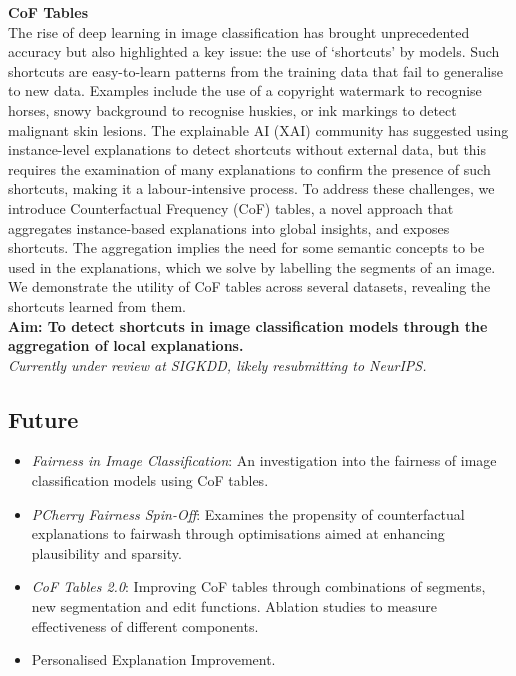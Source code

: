 \noindent
\textbf{CoF Tables}\\
The rise of deep learning in image classification has brought unprecedented accuracy but also highlighted a key 
issue: the use of `shortcuts' by models. Such shortcuts are easy-to-learn patterns from the training data that 
fail to generalise to new data. Examples include the use of a copyright watermark to recognise horses, snowy 
background to recognise huskies, or ink markings to detect malignant skin lesions. The explainable AI (XAI) 
community has suggested using instance-level explanations to detect shortcuts without external data, 
but this requires the examination of many explanations to confirm the presence of such shortcuts, making it a 
labour-intensive process. To address these challenges, we introduce Counterfactual Frequency (CoF) tables, 
a novel approach that aggregates instance-based explanations into global insights, and exposes shortcuts. 
The aggregation implies the need for some semantic concepts to be used in the explanations, which we solve by 
labelling the segments of an image. We demonstrate the utility of CoF tables across several datasets, revealing 
the shortcuts learned from them.\\
\textbf{Aim: To detect shortcuts in image classification models through the aggregation of local explanations.}\\
\textit{Currently under review at SIGKDD, likely resubmitting to NeurIPS.}

\subsection{Future}

\begin{itemize}
    \item \textit{Fairness in Image Classification}: An investigation into the fairness of image classification 
    models using CoF tables.
    \item \textit{PCherry Fairness Spin-Off}: Examines the propensity of counterfactual explanations to 
    fairwash through optimisations aimed at enhancing plausibility and sparsity.
    \item \textit{CoF Tables 2.0}: Improving CoF tables through combinations of segments, 
    new segmentation and edit functions. Ablation studies to measure effectiveness of different components.
    \item Personalised Explanation Improvement.
\end{itemize}